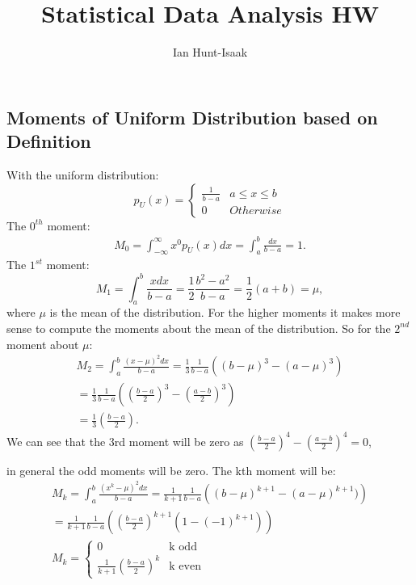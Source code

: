 \documentclass[]{article}
\title{Statistical Data Analysis HW}
\author{Ian Hunt-Isaak}
\date{}
\begin{document}
\maketitle
\section{}
\subsection{Moments of Uniform Distribution based on Definition}

With the uniform distribution:
\begin{equation}
	p_U(x) = \begin{cases}
	\frac{1}{b-a} & a \leq x \leq b\\
	0 & Otherwise
	\end{cases}
\end{equation}
The $0^{th}$ moment:
\begin{align}
M_0 = \int_{-\infty}^{\infty} x^0 p_U(x)dx = \int_{a}^{b} \frac{dx}{b-a} = 1.
\end{align}
The $1^{st}$ moment:
\begin{equation}
M_1 = \int_{a}^{b} \frac{x dx}{b-a} = \frac{1}{2}\frac{b^2-a^2}{b-a} = \frac{1}{2}(a+b) = \mu,
\end{equation}
where $\mu$ is the mean of the distribution. For the higher moments it makes more sense to compute the moments about the mean of the distribution. So for the $2^{nd}$ moment about $\mu$:
\begin{align}
M_2 = \int_{a}^{b} \frac{(x-\mu)^2 dx}{b-a} = \frac{1}{3}\frac{1}{b-a}((b-\mu)^3-(a-\mu)^3) \nonumber \\
= \frac{1}{3}\frac{1}{b-a}((\frac{b-a}{2})^3-(\frac{a-b}{2})^3) \\
= \frac{1}{3}\left(\frac{b-a}{2}\right) \nonumber.
\end{align}
We can see that the 3rd moment will be zero as $(\frac{b-a}{2})^4-(\frac{a-b}{2})^4=0$,

in general the odd moments will be zero. The kth moment will be:
\begin{align}
	M_k = \int_{a}^{b} \frac{(x^k-\mu)^2 dx}{b-a} = \frac{1}{k+1}\frac{1}{b-a}\left((b-\mu)^{k+1}-(a-\mu)^{k+1})\right) \nonumber\\
	= \frac{1}{k+1}\frac{1}{b-a} \left(\left(\frac{b-a}{2}\right)^{k+1}\left(1-(-1)^{k+1}\right)\right) \\
M_k	= \begin{cases}
	0 & \text{k odd}\\
	\frac{1}{k+1}\left(\frac{b-a}{2}\right)^k \nonumber & \text{k even}
	\end{cases}
\end{align}
\end{document}
